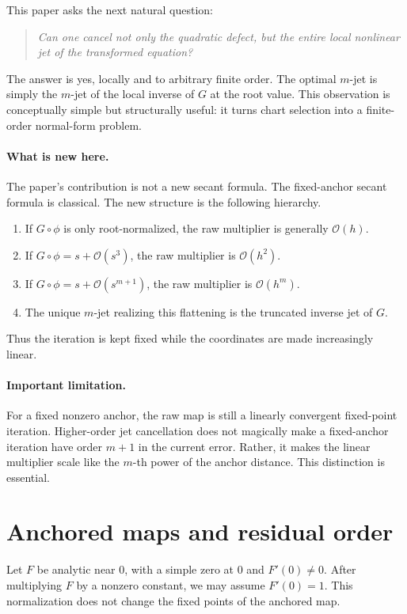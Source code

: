 \documentclass[11pt]{article}
\theoremstyle{definition}
\newcommand{\Oterm}{\mathcal{O}}
\begin{document}
This paper asks the next natural question:
\begin{quote}
\emph{Can one cancel not only the quadratic defect, but the entire local nonlinear jet of the transformed equation?}
\end{quote}
The answer is yes, locally and to arbitrary finite order. The optimal $m$-jet is simply the $m$-jet of the local inverse of $G$ at the root value. This observation is conceptually simple but structurally useful: it turns chart selection into a finite-order normal-form problem.

\paragraph{What is new here.}
The paper's contribution is not a new secant formula. The fixed-anchor secant formula is classical. The new structure is the following hierarchy.
\begin{enumerate}[label=(\roman*)]
    \item If $G\circ\phi$ is only root-normalized, the raw multiplier is generally $\Oterm(h)$.
    \item If $G\circ\phi=s+\Oterm(s^3)$, the raw multiplier is $\Oterm(h^2)$.
    \item If $G\circ\phi=s+\Oterm(s^{m+1})$, the raw multiplier is $\Oterm(h^m)$.
    \item The unique $m$-jet realizing this flattening is the truncated inverse jet of $G$.
\end{enumerate}
Thus the iteration is kept fixed while the coordinates are made increasingly linear.

\paragraph{Important limitation.}
For a fixed nonzero anchor, the raw map is still a linearly convergent fixed-point iteration. Higher-order jet cancellation does not magically make a fixed-anchor iteration have order $m+1$ in the current error. Rather, it makes the linear multiplier scale like the $m$-th power of the anchor distance. This distinction is essential.

\section{Anchored maps and residual order}
Let $F$ be analytic near $0$, with a simple zero at $0$ and $F'(0)\neq 0$. After multiplying $F$ by a nonzero constant, we may assume $F'(0)=1$. This normalization does not change the fixed points of the anchored map.
\end{document}
